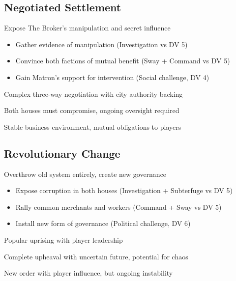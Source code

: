 \documentclass[11pt]{article}
\newenvironment{resolution}[1]{\begin{description}[leftmargin=*,style=standard]\item[\textbf{#1}]}{\end{description}}
\begin{document}
\subsection{Negotiated Settlement}
\begin{resolution}{Negotiated Settlement}
\item[Discovery:] Expose The Broker's manipulation and secret influence
\item[Requirements:] 
  \begin{itemize}
    \item Gather evidence of manipulation (Investigation vs DV 5)
    \item Convince both factions of mutual benefit (Sway + Command vs DV 5)
    \item Gain Matron's support for intervention (Social challenge, DV 4)
  \end{itemize}
\item[Procedure:] Complex three-way negotiation with city authority backing
\item[Costs:] Both houses must compromise, ongoing oversight required
\item[Outcome:] Stable business environment, mutual obligations to players
\end{resolution}

\subsection{Revolutionary Change}
\begin{resolution}{Revolutionary Change}
\item[Approach:] Overthrow old system entirely, create new governance
\item[Requirements:] 
  \begin{itemize}
    \item Expose corruption in both houses (Investigation + Subterfuge vs DV 5)
    \item Rally common merchants and workers (Command + Sway vs DV 5)
    \item Install new form of governance (Political challenge, DV 6)
  \end{itemize}
\item[Procedure:] Popular uprising with player leadership
\item[Costs:] Complete upheaval with uncertain future, potential for chaos
\item[Outcome:] New order with player influence, but ongoing instability
\end{resolution}
\end{document}
